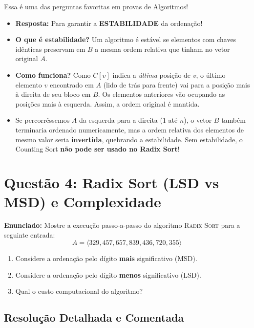 \documentclass[11pt,a4paper]{article}
\begin{document}
\begin{alerta}
Essa é uma das perguntas favoritas em provas de Algoritmos!
\begin{itemize}
    \item \textbf{Resposta:} Para garantir a \textbf{ESTABILIDADE} da ordenação!
    \item \textbf{O que é estabilidade?} Um algoritmo é estável se elementos com chaves idênticas preservam em $B$ a mesma ordem relativa que tinham no vetor original $A$.
    \item \textbf{Como funciona?} Como $C[v]$ indica a \emph{última} posição de $v$, o último elemento $v$ encontrado em $A$ (lido de trás para frente) vai para a posição mais à direita de seu bloco em $B$. Os elementos anteriores vão ocupando as posições mais à esquerda. Assim, a ordem original é mantida.
    \item Se percorrêssemos $A$ da esquerda para a direita ($1$ até $n$), o vetor $B$ também terminaria ordenado numericamente, mas a ordem relativa dos elementos de mesmo valor seria \textbf{invertida}, quebrando a estabilidade. Sem estabilidade, o Counting Sort \textbf{não pode ser usado no Radix Sort}!
\end{itemize}
\end{alerta}

\vspace{0.4cm}

\section*{Questão 4: Radix Sort (LSD vs MSD) e Complexidade}

\textbf{Enunciado:} Mostre a execução passo-a-passo do algoritmo \textsc{Radix Sort} para a seguinte entrada:
\[
A = \langle 329, 457, 657, 839, 436, 720, 355 \rangle
\]
\begin{enumerate}
    \item[(a)] Considere a ordenação pelo dígito \textbf{mais} significativo (MSD).
    \item[(b)] Considere a ordenação pelo dígito \textbf{menos} significativo (LSD).
    \item[(c)] Qual o custo computacional do algoritmo?
\end{enumerate}

\subsection*{Resolução Detalhada e Comentada}
\end{document}
